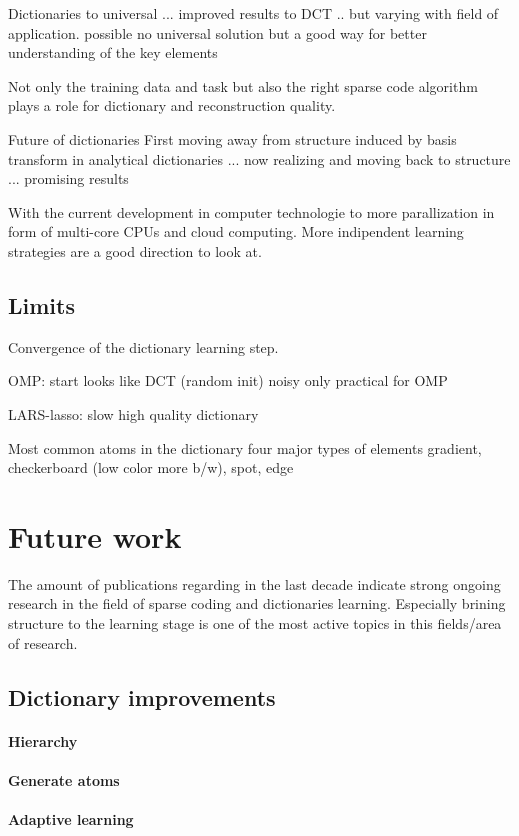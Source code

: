 Dictionaries to universal ... improved results to DCT .. but varying with field
of
application. possible no universal solution but a good way for better
understanding of the key elements 

Not only the training data and task but also the right
sparse code algorithm plays a role for dictionary and reconstruction quality.

Future of dictionaries
First moving away from structure induced by basis transform in analytical
dictionaries ... now realizing and moving back to structure ... promising
results\cite{?,?,?}

With the current development in computer technologie to more
parallization in form of multi-core CPUs and cloud computing.
More indipendent learning strategies are a good direction to look at. 

\subsection*{Limits}
Convergence of the dictionary learning step.

OMP:
  start looks like DCT (random init)
  noisy
  only practical for OMP

LARS-lasso:
  slow 
  high quality dictionary

  Most common atoms in the dictionary 
  four major types of elements
  gradient, checkerboard (low color more b/w), spot, edge

\section{Future work}
The amount of publications regarding in
the last decade indicate strong ongoing research in the field of sparse coding
and dictionaries learning. Especially brining structure to the learning stage is
one of the most active topics in this fields/area of research. 

\subsection{Dictionary improvements}
\paragraph{Hierarchy}
\paragraph{Generate atoms}
\paragraph{Adaptive learning}
